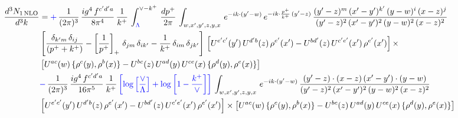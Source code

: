 \documentclass[9pt]{article}
\numberwithin{equation}{section}
\begin{document}
\begin{align}
     \frac{d^{3}N_{1\,\rm NLO}}{d^{3}k} & = {\color{blue}+}\,\frac{1}{(2\pi)^{3}}\, \frac{ig^{4}\,f^{c'd'a}}{8\pi^{4}}\, \frac{1}{k^{+}}\,\int_{{\color{blue}\Lambda}}^{\vee-k^{+}}\,  \frac{dp^{+}}{2\pi}\, \int_{w,x',y',z,y,x}\, e^{-ik\cdot (y'-w)}\, e^{-ik\cdot \frac{p^{+}}{k^{+}}\,(y'-z)}\,\frac{(y'-z)^{m}\,(x'-y')^{k'}\,(y-w)^{i}\,(x-z)^{j}}{(y'-z)^{2}\,(x'-y')^{2}\,(y-w)^{2}\,(x-z)^{2}}\notag \\ & \left[\frac{\delta_{k'm}\,\delta_{ij}}{(p^{+}+k^{+})}-\left[\frac{1}{p^{+}}\right]_{+}\,\delta_{jm}\,\delta_{ik'}-\frac{1}{k^{+}}\, \delta_{im}\, \delta_{jk'}\right]\, \left[U^{e'c'}(y')\,U^{d'b}(z)\,\rho^{e'}(x')-U^{bd'}(z)\,U^{c'e'}(x')\,\rho^{e'}(x')\right]\times\notag \\ &  \left[U^{ac}(w)\, \{\rho^{c}(y),\rho^{b}(x)\}-U^{bc}(z)\,U^{ad}(y)\,U^{ce}(x)\,\{\rho^{d}(y),\rho^{e}(x)\}\right]\notag \\ & {\color{blue}-}\,\frac{1}{(2\pi)^{3}}\, \frac{ig^{4}\,f^{c'd'a}}{16\pi^{5}}\, \frac{1}{k^{+}}\,{\color{blue}\left[\log{\left[\frac{\vee}{\Lambda}\right]} + \log{\left[1-\frac{k^{+}}{\vee}\right]}\right]}\, \int_{w,x',y',z,y,x}\, e^{-ik\cdot (y'-w)}\,\frac{(y'-z)\cdot (x-z)\,(x'-y')\cdot (y-w)}{(y'-z)^{2}\,(x'-y')^{2}\,(y-w)^{2}\,(x-z)^{2}}\notag \\ &  \left[U^{e'c'}(y')\,U^{d'b}(z)\,\rho^{e'}(x')-U^{bd'}(z)\,U^{c'e'}(x')\,\rho^{e'}(x')\right]\times  \left[U^{ac}(w)\, \{\rho^{c}(y),\rho^{b}(x)\}-U^{bc}(z)\,U^{ad}(y)\,U^{ce}(x)\,\{\rho^{d}(y),\rho^{e}(x)\}\right]
\end{align} 
\end{document}
